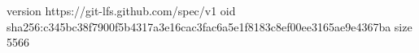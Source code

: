 version https://git-lfs.github.com/spec/v1
oid sha256:c345bc38f7900f5b4317a3e16cac3fac6a5e1f8183c8ef00ee3165ae9e4367ba
size 5566
